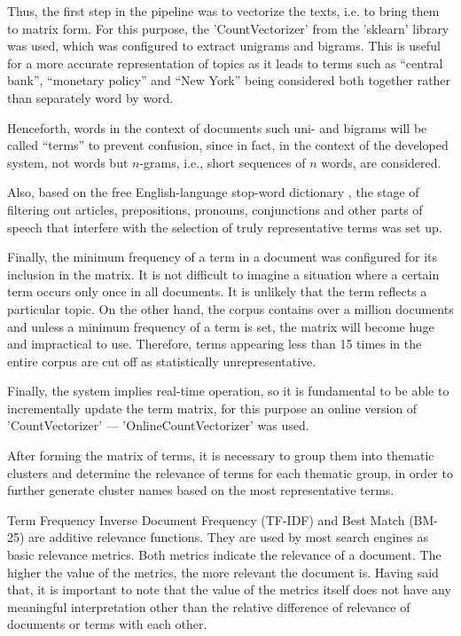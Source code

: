 Thus, the first step in the pipeline was to vectorize the texts, i.e. to bring them to matrix
form. For this purpose, the 'CountVectorizer' from the 'sklearn' library was used, which was
configured to extract unigrams and bigrams. This is useful for a more accurate representation
of topics as it leads to terms such as “central bank”, “monetary policy” and “New York” being
considered both together rather than separately word by word.

Henceforth, words in the context of documents such uni- and bigrams will be called “terms”
to prevent confusion, since in fact, in the context of the developed system, not words but
$n$-grams, i.e., short sequences of $n$ words, are considered.

Also, based on the free English-language stop-word dictionary \parencite{nothman2018stop},
the stage of filtering out articles, prepositions, pronouns, conjunctions and other parts
of speech that interfere with the selection of truly representative terms was set up.

Finally, the minimum frequency of a term in a document was configured for its inclusion
in the matrix. It is not difficult to imagine a situation where a certain term occurs only
once in all documents. It is unlikely that the term reflects a particular topic. On the other
hand, the corpus contains over a million documents and unless a minimum frequency of a term
is set, the matrix will become huge and impractical to use. Therefore, terms appearing less
than 15 times in the entire corpus are cut off as statistically unrepresentative.

Finally, the system implies real-time operation, so it is fundamental to be able
to incrementally update the term matrix, for this purpose an online version
of 'CountVectorizer' --- 'OnlineCountVectorizer' was used.

After forming the matrix of terms, it is necessary to group them into thematic clusters
and determine the relevance of terms for each thematic group, in order to further generate
cluster names based on the most representative terms.

Term Frequency Inverse Document Frequency (TF-IDF) and Best Match (BM-25) are additive
relevance functions. They are used by most search engines as basic relevance metrics.
Both metrics indicate the relevance of a document. The higher the value of the metrics,
the more relevant the document is. Having said that, it is important to note that
the value of the metrics itself does not have any meaningful interpretation other than
the relative difference of relevance of documents or terms with each other.

